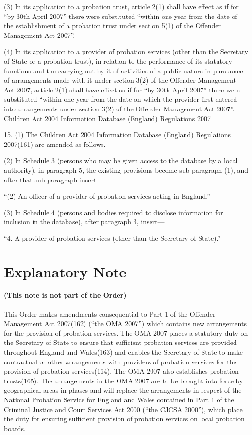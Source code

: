 \documentclass[12pt,a4paper]{article}
\begin{document}
(3) In its application to a probation trust, article 2(1) shall have effect as if for “by 30th April 2007” there were substituted “within one year from the date of the establishment of a probation trust under section 5(1) of the Offender Management Act 2007”.

(4) In its application to a provider of probation services (other than the Secretary of State or a probation trust), in relation to the performance of its statutory functions and the carrying out by it of activities of a public nature in pursuance of arrangements made with it under section 3(2) of the Offender Management Act 2007, article 2(1) shall have effect as if for “by 30th April 2007” there were substituted “within one year from the date on which the provider first entered into arrangements under section 3(2) of the Offender Management Act 2007”.
Children Act 2004 Information Database (England) Regulations 2007

15.  (1)  The Children Act 2004 Information Database (England) Regulations 2007(161) are amended as follows.

(2) In Schedule 3 (persons who may be given access to the database by a local authority), in paragraph 5, the existing provisions become sub-paragraph (1), and after that sub-paragraph insert—

“(2) An officer of a provider of probation services acting in England.”

(3) In Schedule 4 (persons and bodies required to disclose information for inclusion in the database), after paragraph 3, insert—

“4.  A provider of probation services (other than the Secretary of State).”

\part{Explanatory Note}

\renewcommand\parthead{— Explanatory Note}

\subsection*{(This note is not part of the Order)}

This Order makes amendments consequential to Part 1 of the Offender Management Act 2007(162) (“the OMA 2007”) which contains new arrangements for the provision of probation services. The OMA 2007 places a statutory duty on the Secretary of State to ensure that sufficient probation services are provided throughout England and Wales(163) and enables the Secretary of State to make contractual or other arrangements with providers of probation services for the provision of probation services(164). The OMA 2007 also establishes probation trusts(165). The arrangements in the OMA 2007 are to be brought into force by geographical areas in phases and will replace the arrangements in respect of the National Probation Service for England and Wales contained in Part 1 of the Criminal Justice and Court Services Act 2000 (“the CJCSA 2000”), which place the duty for ensuring sufficient provision of probation services on local probation boards.
\end{document}
